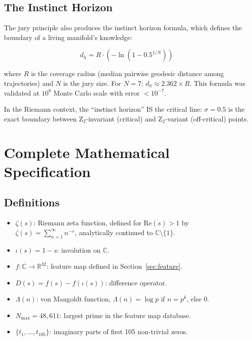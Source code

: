 \documentclass[11pt]{article}
\begin{document}
\subsection{The Instinct Horizon}

The jury principle also produces the instinct horizon formula, which defines the boundary of a living manifold's knowledge:

\begin{equation}
d_h = R \cdot (-\ln(1 - 0.5^{1/N}))
\end{equation}

where $R$ is the coverage radius (median pairwise geodesic distance among trajectories) and $N$ is the jury size. For $N=7$: $d_h \approx 2.362 \times R$. This formula was validated at $10^8$ Monte Carlo scale with error $< 10^{-7}$.

In the Riemann context, the ``instinct horizon'' IS the critical line: $\sigma = 0.5$ is the exact boundary between Z$_2$-invariant (critical) and Z$_2$-variant (off-critical) points.

\newpage
\section{Complete Mathematical Specification}
\label{sec:spec}

\subsection{Definitions}

\begin{itemize}
\item $\zeta(s)$: Riemann zeta function, defined for $\mathrm{Re}(s) > 1$ by $\zeta(s) = \sum_{n=1}^{\infty} n^{-s}$, analytically continued to $\mathbb{C} \setminus \{1\}$.
\item $\iota(s) = 1 - s$: involution on $\mathbb{C}$.
\item $f: \mathbb{C} \to \mathbb{R}^{32}$: feature map defined in Section~\ref{sec:feature}.
\item $D(s) = f(s) - f(\iota(s))$: difference operator.
\item $\Lambda(n)$: von Mangoldt function, $\Lambda(n) = \log p$ if $n = p^k$, else 0.
\item $N_{\max} = 48,611$: largest prime in the feature map database.
\item $\{t_1, \ldots, t_{105}\}$: imaginary parts of first 105 non-trivial zeros.
\end{itemize}
\end{document}
